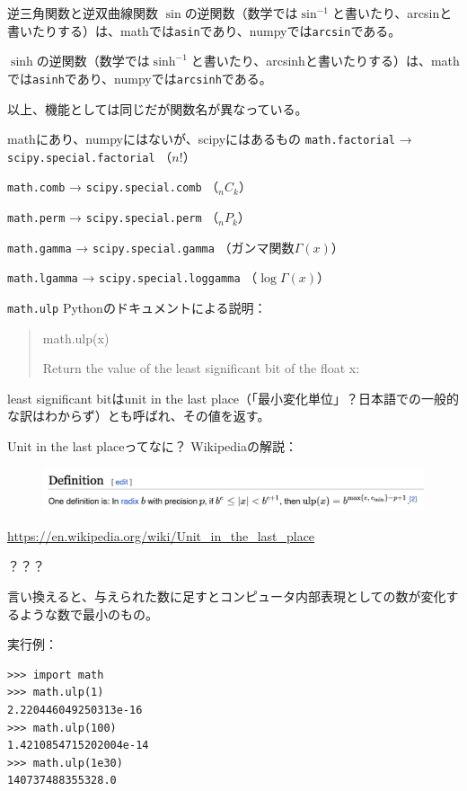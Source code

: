 \documentclass[unicode,lualatex,aspectratio=169]{beamer}
\begin{document}
\begin{frame}[fragile]{逆三角関数と逆双曲線関数}
  $\sin$の逆関数（数学では$\sin^{-1}$と書いたり、arcsinと書いたりする）は、mathでは\verb|asin|であり、numpyでは\verb|arcsin|である。

  
  $\sinh$の逆関数（数学では$\sinh^{-1}$と書いたり、arcsinhと書いたりする）は、mathでは\verb|asinh|であり、numpyでは\verb|arcsinh|である。

  以上、機能としては同じだが関数名が異なっている。
\end{frame}
\begin{frame}[fragile]{mathにあり、numpyにはないが、scipyにはあるもの}
  \verb|math.factorial| → \verb|scipy.special.factorial| （$n!$）
  
  \verb|math.comb| → \verb|scipy.special.comb| （${}_n C_k$）
  
  \verb|math.perm| → \verb|scipy.special.perm| （${}_n P_k$）

  \verb|math.gamma| → \verb|scipy.special.gamma| （ガンマ関数$\Gamma(x)$）
  
  \verb|math.lgamma| → \verb|scipy.special.loggamma| （$\log \Gamma(x)$）
\end{frame}
\begin{frame}[fragile]{{\tt math.ulp}}
  Pythonのドキュメントによる説明：
  {\small
  \begin{quote}
    \noindent math.ulp(x)
    
    \hspace{3mm}Return the value of the least significant bit of the float x:
  \end{quote}
}

least significant bitはunit in the last place（「最小変化単位」？日本語での一般的な訳はわからず）とも呼ばれ、その値を返す。
\end{frame}
\begin{frame}[fragile]{Unit in the last placeってなに？}
Wikipediaの解説：
\begin{figure}[!ht]
\includegraphics[scale=.4]{img/wikipedia-ulp.png}
\end{figure}
{\tiny \url{https://en.wikipedia.org/wiki/Unit\_in\_the\_last\_place}}

？？？

言い換えると、与えられた数に足すとコンピュータ内部表現としての数が変化するような数で最小のもの。

実行例：
{\fontsize{6pt}{6pt}\selectfont    
\begin{verbatim}
>>> import math
>>> math.ulp(1)
2.220446049250313e-16
>>> math.ulp(100)
1.4210854715202004e-14
>>> math.ulp(1e30)
140737488355328.0
\end{verbatim}
}
\end{frame}
\end{document}
